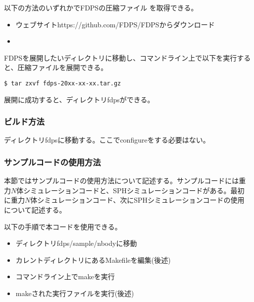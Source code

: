 以下の方法のいずれかでFDPSの圧縮ファイル
を取得できる。
\begin{itemize}
\item ウェブサイトhttps://github.com/FDPS/FDPSからダウンロード
\item {}
\end{itemize}

FDPSを展開したいディレクトリに移動し、コマンドライン上で以下を実行する
と、圧縮ファイルを展開できる。
\begin{screen}
\begin{verbatim}
$ tar zxvf fdps-20xx-xx-xx.tar.gz
\end{verbatim}
\end{screen}
展開に成功すると、ディレクトリfdpsができる。

\subsubsection{ビルド方法}

ディレクトリfdpsに移動する。ここでconfigureをする必要はない。

\subsubsection{サンプルコードの使用方法}

本節ではサンプルコードの使用方法について記述する。サンプルコードには重
力$N$体シミュレーションコードと、SPHシミュレーションコードがある。最初
に重力$N$体シミュレーションコード、次にSPHシミュレーションコードの使用
について記述する。


以下の手順で本コードを使用できる。
\begin{itemize}
\item ディレクトリfdps/sample/nbodyに移動
\item カレントディレクトリにあるMakefileを編集(後述)
\item コマンドライン上でmakeを実行
\item makeされた実行ファイルを実行(後述)
\end{itemize}

